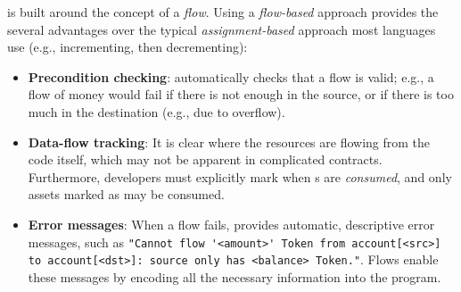 \documentclass[nonacm, dvipsnames, usenames, sigconf]{acmart}
\begin{document}
\langName is built around the concept of a \emph{flow}.%
Using a \emph{flow-based} approach provides the several advantages over the typical \emph{assignment-based} approach most languages use (e.g., incrementing, then decrementing):
\begin{itemize}
    \item \textbf{Precondition checking}: \langName automatically checks that a flow is valid; e.g., a flow of money would fail if there is not enough in the source, or if there is too much in the destination (e.g., due to overflow).
    \item \textbf{Data-flow tracking}: It is clear where the resources are flowing from the code itself, which may not be apparent in complicated contracts. %
        Furthermore, developers must explicitly mark when \assetTxt{}s are \emph{consumed}, and only assets marked as  may be consumed.
    \item \textbf{Error messages}: When a flow fails, \langName provides automatic, descriptive error messages, such as \lstinline{"Cannot flow '<amount>' Token from account[<src>] to account[<dst>]: source only has <balance> Token."}.
        Flows enable these messages by encoding all the necessary information into the program.%
\end{itemize}
\end{document}
